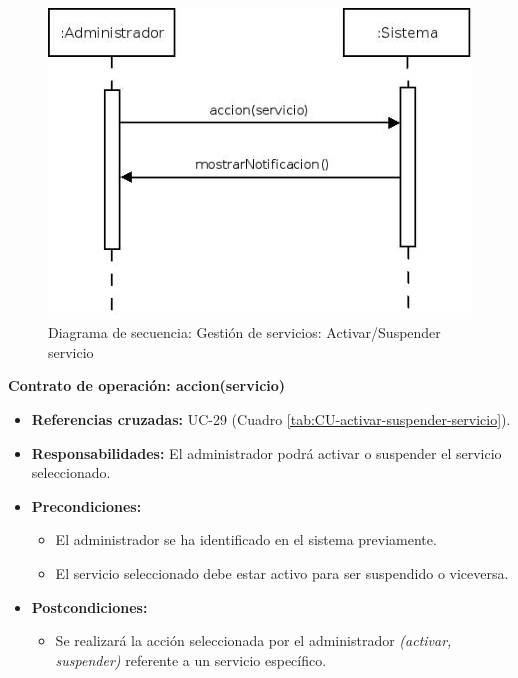 \begin{figure}[H]
\centering
  \includegraphics[scale=.55]{img/secuencias/gestion-servicios-suspender-activar-servicio.jpeg}
  \caption{Diagrama de secuencia: Gestión de servicios: Activar/Suspender servicio}
  \label{fig:secuencia-gestion-servicios-suspender-activar-servicio}
\end{figure}

\textbf{Contrato de operación: accion(servicio)}
\begin{itemize}
\item \textbf{Referencias cruzadas:} UC-29 (Cuadro \ref{tab:CU-activar-suspender-servicio}).
\item \textbf{Responsabilidades:} El administrador podrá activar o suspender el servicio seleccionado.
\item \textbf{Precondiciones:} 
 \begin{itemize}
\item El administrador se ha identificado en el sistema previamente.
\item El servicio seleccionado debe estar activo para ser suspendido o viceversa.
\end {itemize}
\item \textbf{Postcondiciones:} 
 \begin{itemize}
\item Se realizará la acción seleccionada por el administrador \textit{(activar, suspender)} referente a un servicio específico.
\end {itemize}
\end {itemize}

